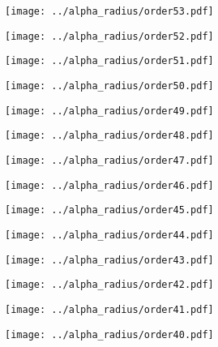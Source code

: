 \documentclass{article}
\begin{document}
\begin{figure}[H]
    \centering
    \texttt{[image: ../alpha\_radius/order53.pdf]}
\end{figure}
\begin{figure}[H]
    \centering
    \texttt{[image: ../alpha\_radius/order52.pdf]}
\end{figure}
\begin{figure}[H]
    \centering
    \texttt{[image: ../alpha\_radius/order51.pdf]}
\end{figure}
\begin{figure}[H]
    \centering
    \texttt{[image: ../alpha\_radius/order50.pdf]}
\end{figure}
\begin{figure}[H]
    \centering
    \texttt{[image: ../alpha\_radius/order49.pdf]}
\end{figure}
\begin{figure}[H]
    \centering
    \texttt{[image: ../alpha\_radius/order48.pdf]}
\end{figure}
\begin{figure}[H]
    \centering
    \texttt{[image: ../alpha\_radius/order47.pdf]}
\end{figure}
\begin{figure}[H]
    \centering
    \texttt{[image: ../alpha\_radius/order46.pdf]}
\end{figure}
\begin{figure}[H]
    \centering
    \texttt{[image: ../alpha\_radius/order45.pdf]}
\end{figure}
\begin{figure}[H]
    \centering
    \texttt{[image: ../alpha\_radius/order44.pdf]}
\end{figure}
\begin{figure}[H]
    \centering
    \texttt{[image: ../alpha\_radius/order43.pdf]}
\end{figure}
\begin{figure}[H]
    \centering
    \texttt{[image: ../alpha\_radius/order42.pdf]}
\end{figure}
\begin{figure}[H]
    \centering
    \texttt{[image: ../alpha\_radius/order41.pdf]}
\end{figure}
\begin{figure}[H]
    \centering
    \texttt{[image: ../alpha\_radius/order40.pdf]}
\end{figure}
\end{document}
